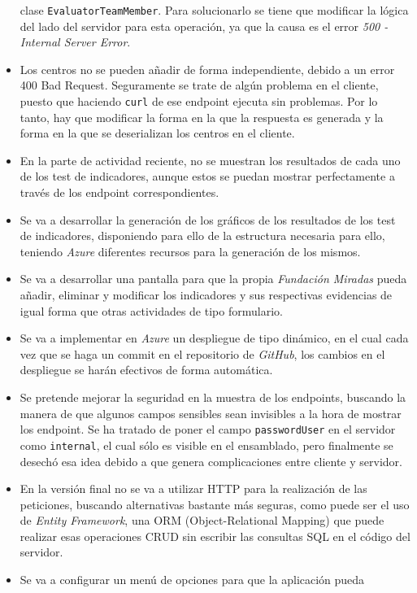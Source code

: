 \begin{itemize}
    clase \texttt{EvaluatorTeamMember}. Para solucionarlo se tiene que modificar
    la lógica del lado del servidor para esta operación, ya que la causa es el
    error \textit{500 - Internal Server Error}.
    \item Los centros no se pueden añadir de forma independiente, debido a un
    error 400 Bad Request. Seguramente se trate de algún problema en el cliente,
    puesto que haciendo \texttt{curl} de ese endpoint ejecuta sin problemas. Por
    lo tanto, hay que modificar la forma en la que la respuesta es generada y la
    forma en la que se deserializan los centros en el cliente.
    \item En la parte de actividad reciente, no se muestran los resultados de
    cada uno de los test de indicadores, aunque estos se puedan mostrar
    perfectamente a través de los endpoint correspondientes.
    \item Se va a desarrollar la generación de los gráficos de los resultados de
    los test de indicadores, disponiendo para ello de la estructura necesaria para
    ello, teniendo \textit{Azure} diferentes recursos para la generación de los mismos.
    \item Se va a desarrollar una pantalla para que la propia \textit{Fundación
    Miradas} pueda añadir, eliminar y modificar los indicadores y sus
    respectivas evidencias de igual forma que otras actividades de tipo formulario.
    \item Se va a implementar en \textit{Azure} un despliegue de tipo dinámico,
    en el cual cada vez que se haga un commit en el repositorio de
    \textit{GitHub}, los cambios en el despliegue se harán efectivos de forma
    automática.
    \item Se pretende mejorar la seguridad en la muestra de los endpoints,
    buscando la manera de que algunos campos sensibles sean invisibles a la hora
    de mostrar los endpoint. Se ha tratado de poner el campo
    \texttt{passwordUser} en el servidor como \texttt{internal}, el cual sólo
    es visible en el ensamblado, pero finalmente se desechó esa idea debido a
    que genera complicaciones entre cliente y servidor.
    \item En la versión final no se va a utilizar HTTP para la realización de
    las peticiones, buscando alternativas bastante más seguras, como puede ser
    el uso de \textit{Entity Framework}, una ORM (Object-Relational Mapping) que
    puede realizar esas operaciones CRUD sin escribir las consultas SQL en el
    código del servidor.
    \item Se va a configurar un menú de opciones para que la aplicación pueda

\end{itemize}
